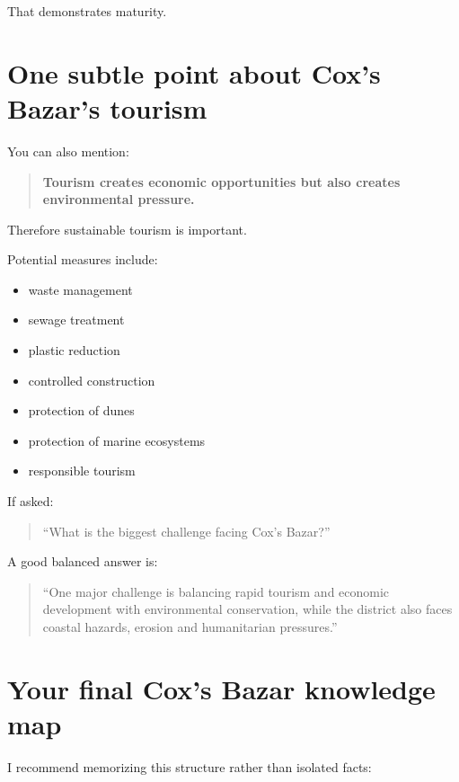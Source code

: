 That demonstrates maturity.

\medskip

\section{One subtle point about Cox's Bazar's tourism}

You can also mention:

\begin{quote}
\textbf{Tourism creates economic opportunities but also creates environmental pressure.}\\
\end{quote}

Therefore sustainable tourism is important.

Potential measures include:

\begin{itemize}
  \item waste management
  \item sewage treatment
  \item plastic reduction
  \item controlled construction
  \item protection of dunes
  \item protection of marine ecosystems
  \item responsible tourism
\end{itemize}

If asked:

\begin{quote}
``What is the biggest challenge facing Cox's Bazar?''\\
\end{quote}

A good balanced answer is:

\begin{quote}
``One major challenge is balancing rapid tourism and economic development with environmental conservation, while the district also faces coastal hazards, erosion and humanitarian pressures.''\\
\end{quote}

\medskip

\section{Your final Cox's Bazar knowledge map}

I recommend memorizing this structure rather than isolated facts:

